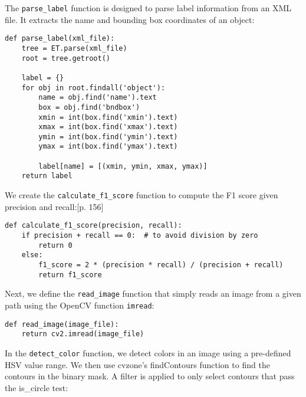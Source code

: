The \verb|parse_label| function is designed to parse label information from an XML file. It extracts the name and bounding box coordinates of an object:

\begin{lstlisting}[language=PythonPlus]
def parse_label(xml_file):
    tree = ET.parse(xml_file)
    root = tree.getroot()

    label = {}
    for obj in root.findall('object'):
        name = obj.find('name').text
        box = obj.find('bndbox')
        xmin = int(box.find('xmin').text)
        xmax = int(box.find('xmax').text)
        ymin = int(box.find('ymin').text)
        ymax = int(box.find('ymax').text)
        
        label[name] = [(xmin, ymin, xmax, ymax)]
    return label
\end{lstlisting}
\newpage
We create the \verb|calculate_f1_score| function to compute the F1 score given precision and recall:\cite{preandrec}[p. 156]

\begin{lstlisting}[language=PythonPlus]
def calculate_f1_score(precision, recall):
    if precision + recall == 0:  # to avoid division by zero
        return 0
    else:
        f1_score = 2 * (precision * recall) / (precision + recall)
        return f1_score
\end{lstlisting}

Next, we define the \verb|read_image| function that simply reads an image from a given path using the OpenCV function \verb|imread|:

\begin{lstlisting}[language=PythonPlus]
def read_image(image_file):
    return cv2.imread(image_file)
\end{lstlisting}

In the \verb|detect_color| function, we detect colors in an image using a pre-defined HSV value range. We then use cvzone's findContours function to find the contours in the binary mask. A filter is applied to only select contours that pass the is\_circle test:

